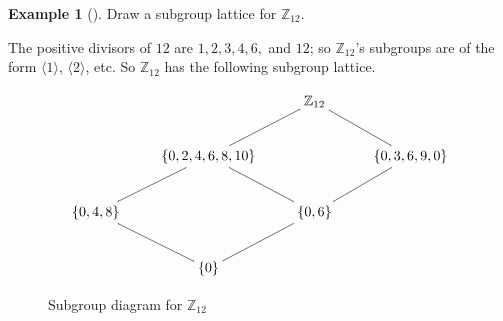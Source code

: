 \documentclass[10pt,]{book}
\theoremstyle{plain}
\theoremstyle{definition}
\theoremstyle{definition}
\theoremstyle{definition}
\newtheorem{example}[theorem]{Example}
\theoremstyle{definition}
\numberwithin{equation}{section}
\def\Z{\mathbb{Z}}
\begin{document}
\begin{example}[]\label{example-47}
Draw a subgroup lattice for \(\Z_{12}\).%
\par
The positive divisors of \(12\) are \(1,2,3,4,6,\) and \(12\); so \(\Z_{12}\)'s subgroups are of the form \(\langle 1\rangle\), \(\langle 2\rangle\), etc. So \(\Z_{12}\) has the following subgroup lattice.%
\begin{figure}
\centering
{
      \[ \xymatrix{
& &\Z_{12} \ar@{-}[ld] \ar@{-}[rd]&\\
&\{0,2,4,6,8,10\} \ar@{-}[ld]\ar@{-}[rd]& &\{0, 3,6,9,0\} \ar@{-}[ld]\\ \{0,4,8\}\ar@{-}[dr]& & \{0,6\} \ar@{-}[dl]& \\
& \{0\} & &} \]
}
\caption{Subgroup diagram for \(\Z_{12}\)\label{figure-7}}
\end{figure}
\end{example}
\typeout{************************************************}
\typeout{************************************************}
\end{document}

